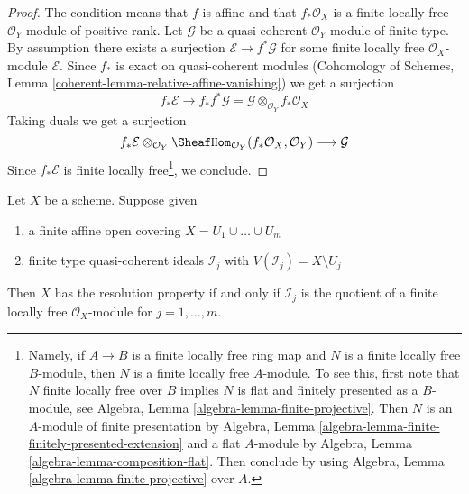 \begin{proof}
The condition means that $f$ is affine and that $f_*\mathcal{O}_X$
is a finite locally free $\mathcal{O}_Y$-module of positive rank.
Let $\mathcal{G}$ be a quasi-coherent $\mathcal{O}_Y$-module
of finite type. By assumption there exists a surjection
$\mathcal{E} \to f^*\mathcal{G}$ for some finite locally free
$\mathcal{O}_X$-module $\mathcal{E}$. Since $f_*$ is exact on
quasi-coherent modules
(Cohomology of Schemes, Lemma \ref{coherent-lemma-relative-affine-vanishing})
we get a surjection
$$
f_*\mathcal{E}
\longrightarrow
f_*f^*\mathcal{G} = \mathcal{G} \otimes_{\mathcal{O}_Y} f_*\mathcal{O}_X
$$
Taking duals we get a surjection
$$
f_*\mathcal{E}
\otimes_{\mathcal{O}_Y}
\SheafHom_{\mathcal{O}_Y}(f_*\mathcal{O}_X, \mathcal{O}_Y)
\longrightarrow
\mathcal{G}
$$
Since $f_*\mathcal{E}$ is finite locally free\footnote{Namely,
if $A \to B$ is a finite locally free ring map
and $N$ is a finite locally free $B$-module, then $N$
is a finite locally free $A$-module. To see this, first note
that $N$ finite locally free over $B$ implies $N$ is
flat and finitely presented as a $B$-module, see
Algebra, Lemma \ref{algebra-lemma-finite-projective}. Then
$N$ is an $A$-module of finite presentation by
Algebra, Lemma \ref{algebra-lemma-finite-finitely-presented-extension}
and a flat $A$-module by Algebra, Lemma \ref{algebra-lemma-composition-flat}.
Then conclude by using
Algebra, Lemma \ref{algebra-lemma-finite-projective} over $A$.},
we conclude.
\end{proof}

\begin{lemma}
\label{lemma-resolution-property-finite-number}
Let $X$ be a scheme. Suppose given
\begin{enumerate}
\item a finite affine open covering $X = U_1 \cup \ldots \cup U_m$
\item finite type quasi-coherent ideals $\mathcal{I}_j$
with $V(\mathcal{I}_j) = X \setminus U_j$
\end{enumerate}
Then $X$ has the resolution property if and only if $\mathcal{I}_j$
is the quotient of a finite locally free $\mathcal{O}_X$-module
for $j = 1, \ldots, m$.
\end{lemma}

